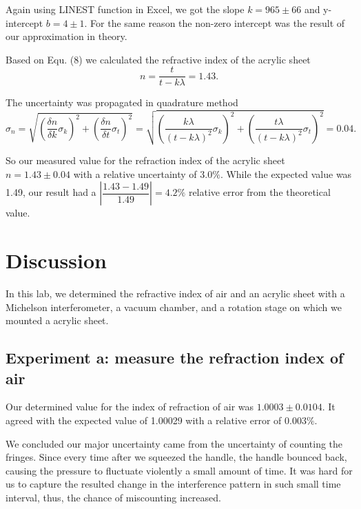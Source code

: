 \documentclass[12pt]{article}
\begin{document}
Again using LINEST function in Excel, we got the slope $k=965\pm66$ and y-intercept $b=4\pm1$. For the same reason the non-zero intercept was the result of our approximation in theory. 

Based on Equ. (8) we calculated the refractive index of the acrylic sheet 
\begin{equation}
n=\dfrac{t}{t-k\lambda}=1.43.
\nonumber
\end{equation}

The uncertainty was propagated in quadrature method
\begin{equation}
\sigma_{n}=\sqrt{(\dfrac{\delta{n}}{\delta{k}}\sigma_{k})^{2}+(\dfrac{\delta{n}}{\delta{t}}\sigma_{t})^{2}}=\sqrt{(\dfrac{k\lambda}{(t-k\lambda)^{2}}\sigma_{k})^{2}+(\dfrac{t\lambda}{(t-k\lambda)^{2}}\sigma_{t})^{2}}=0.04.
\nonumber
\end{equation}

So our measured value for the refraction index of the acrylic sheet $n=1.43\pm0.04$ with a relative uncertainty of $3.0\%$. While the expected value was 1.49, our result had a $\left|\dfrac{1.43-1.49}{1.49}\right|=4.2\%$ relative error from the theoretical value. 
\section{Discussion}
In this lab, we determined the refractive index of air and an acrylic sheet with a Michelson interferometer, a vacuum chamber, and a rotation stage on which we mounted a acrylic sheet. 

\subsection{Experiment a: measure the refraction index of air }
Our determined value for the index of refraction of air was $1.0003\pm0.0104$. It agreed with the expected value of 1.00029 with a relative error of  $0.003\%$.

We concluded our major uncertainty came from the uncertainty of counting the fringes. Since every time after we squeezed the handle, the handle bounced back, causing the pressure to fluctuate violently a small amount of time. It was hard for us to capture the resulted change in the interference pattern in such small time interval, thus, the chance of miscounting increased. 
\end{document}
